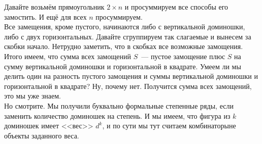 \documentclass{article}
\begin{document}
    \begin{remark}
        Давайте возьмём прямоугольник $2\times n$ и просуммируем все способы его замостить. И ещё для всех $n$ просуммируем.\\
        Все замещения, кроме пустого, начинаются либо с вертикальной доминошки, либо с двух горизонтальных. Давайте сгруппируем так слагаемые и вынесем за скобки начало. Нетрудно заметить, что в скобках все возможные замощения. Итого имеем, что сумма всех замощений $S$~--- пустое замощение плюс $S$ на сумму вертикальной доминошки и горизонтальной в квадрате. Умеем ли мы делить один на разность пустого замощения и суммы вертикальной доминошки и горизонтальной в квадрате? Ну, почему нет. Получится сумма всех замощений, это мы уже знаем.\\
        Но смотрите. Мы получили буквально формальные степенные ряды, если заменить количество доминошек на степень. И мы имеем, что фигура из $k$ доминошек имеет <<вес>> $d^k$, и по сути мы тут считаем комбинаторыне объекты заданного веса.
    \end{remark}
\end{document}
